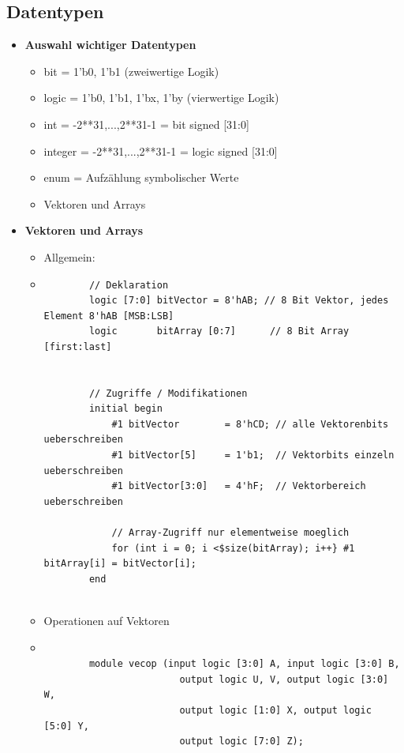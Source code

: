 \documentclass[11pt,a4paper]{article}
\begin{document}
\subsection{Datentypen}
\begin{itemize}

\item \textbf{Auswahl wichtiger Datentypen}
	\begin{itemize}
	\item bit = {1'b0, 1'b1} (zweiwertige Logik)
	\item logic = {1'b0, 1'b1, 1'bx, 1'by} (vierwertige Logik)
	\item int = {-2**31,...,2**31-1} = bit signed [31:0]
	\item integer = {-2**31,...,2**31-1} = logic signed [31:0]
	\item enum = Aufzählung symbolischer Werte
	\item Vektoren und Arrays
	\end{itemize}
	
\item \textbf{Vektoren und Arrays}
	\begin{itemize}
	\item Allgemein:
	\item[]
		\begin{lstlisting}
		// Deklaration
		logic [7:0] bitVector = 8'hAB; // 8 Bit Vektor, jedes Element 8'hAB [MSB:LSB]
		logic 		bitArray [0:7] 		// 8 Bit Array [first:last]
		
		
		// Zugriffe / Modifikationen
		initial begin 
			#1 bitVector  		= 8'hCD; // alle Vektorenbits ueberschreiben
			#1 bitVector[5] 	= 1'b1;	 // Vektorbits einzeln ueberschreiben
			#1 bitVector[3:0]	= 4'hF;	 // Vektorbereich ueberschreiben
			
			// Array-Zugriff nur elementweise moeglich
			for (int i = 0; i <$size(bitArray); i++} #1 bitArray[i] = bitVector[i];
		end
		
		\end{lstlisting}
		
\pagebreak		
		
	\item Operationen auf Vektoren
	\item[]
		\begin{lstlisting}
		
		module vecop (input logic [3:0] A, input logic [3:0] B,
						output logic U, V, output logic [3:0] W,
						output logic [1:0] X, output logic [5:0] Y,
						output logic [7:0] Z);
			

\end{lstlisting}
\end{itemize}
\end{itemize}
\end{document}
